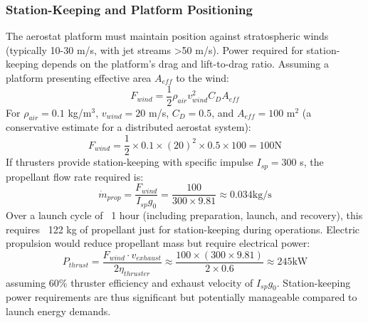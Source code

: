\subsubsection{Station-Keeping and Platform Positioning}
The aerostat platform must maintain position against stratospheric winds (typically 10-30 m/s, with jet streams >50 m/s). Power required for station-keeping depends on the platform's drag and lift-to-drag ratio. Assuming a platform presenting effective area $A_{eff}$ to the wind:
\begin{equation}
F_{wind} = \frac{1}{2} \rho_{air} v_{wind}^2 C_D A_{eff}
\end{equation}
For $\rho_{air} = 0.1$ kg/m$^3$, $v_{wind} = 20$ m/s, $C_D = 0.5$, and $A_{eff} = 100$ m$^2$ (a conservative estimate for a distributed aerostat system):
\begin{equation}
F_{wind} = \frac{1}{2} \times 0.1 \times (20)^2 \times 0.5 \times 100 = 100  \text{N}
\end{equation}
If thrusters provide station-keeping with specific impulse $I_{sp} = 300$ s, the propellant flow rate required is:
\begin{equation}
\dot{m}_{prop} = \frac{F_{wind}}{I_{sp} g_0} = \frac{100}{300 \times 9.81} \approx 0.034  \text{kg/s}
\end{equation}
Over a launch cycle of ~1 hour (including preparation, launch, and recovery), this requires ~122 kg of propellant just for station-keeping during operations. Electric propulsion would reduce propellant mass but require electrical power:
\begin{equation}
P_{thrust} = \frac{F_{wind} \cdot v_{exhaust}}{2 \eta_{thruster}} \approx \frac{100 \times (300 \times 9.81)}{2 \times 0.6} \approx 245  \text{kW}
\end{equation}
assuming 60\% thruster efficiency and exhaust velocity of $I_{sp} g_0$. Station-keeping power requirements are thus significant but potentially manageable compared to launch energy demands.

